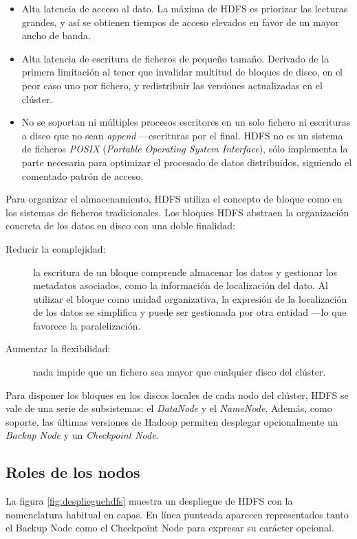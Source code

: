\begin{itemize}
 \item Alta latencia de acceso al dato. La m\'axima de HDFS es priorizar las lecturas grandes, y as\'i se obtienen tiempos de acceso elevados en favor de un mayor ancho de banda.
 \item Alta latencia de escritura de ficheros de peque\~no tama\~no. Derivado de la primera limitaci\'on al tener que invalidar multitud de bloques de disco, en el peor caso uno por fichero, y redistribuir las versiones actualizadas en el cl\'uster.
 \item No se soportan ni m\'ultiples procesos escritores en un solo fichero ni escrituras a disco que no sean \emph{append} ---escrituras por el final. HDFS no es un sistema de ficheros \emph{POSIX} (\emph{Portable Operating System Interface}), s\'olo implementa la parte necesaria para optimizar el procesado de datos distribuidos, siguiendo el comentado patr\'on de acceso.
\end{itemize}

Para organizar el almacenamiento, HDFS utiliza el concepto de bloque como en los sistemas de ficheros tradicionales. Los bloques HDFS abstraen la organizaci\'on concreta de los datos en disco con una doble finalidad: 
\begin{description}
 \item[Reducir la complejidad:] la escritura de un bloque comprende almacenar los datos y gestionar los metadatos asociados, como la informaci\'on de localizaci\'on del dato. Al utilizar el bloque como unidad organizativa, la expresi\'on de la localizaci\'on de los datos se simplifica y puede ser gestionada por otra entidad ---lo que favorece la paralelizaci\'on.
 \item[Aumentar la flexibilidad:] nada impide que un fichero sea mayor que cual\-quier disco del cl\'uster.
\end{description}

Para disponer los bloques en los discos locales de cada nodo del cl\'uster, HDFS se vale de una serie de subsistemas: el \emph{DataNode} y el \emph{NameNode}. Adem\'as, como soporte, las \'ultimas versiones de Hadoop permiten desplegar opcionalmente un \emph{Backup Node} y un \emph{Checkpoint Node}.


\subsection{Roles de los nodos}\label{subsec:rolesnodos}
\noindent La figura \ref{fig:desplieguehdfs} muestra un despliegue de HDFS con la nomenclatura habitual en capas. En l\'inea punteada aparecen representados tanto el Backup Node como el Checkpoint Node para expresar su car\'acter opcional.

